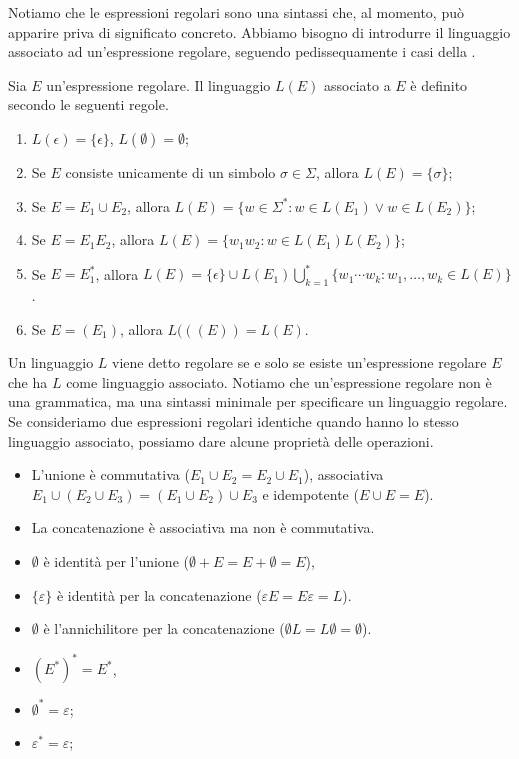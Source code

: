 Notiamo che le espressioni regolari sono una sintassi che, al momento, può apparire priva di significato concreto.
Abbiamo bisogno di introdurre il linguaggio associato ad un'espressione regolare, seguendo pedissequamente i casi della .

\begin{definition}\label{def:regex-linguaggio}
Sia $E$ un'espressione regolare. Il linguaggio $L(E)$ associato a $E$ è definito secondo le seguenti regole.
\begin{enumerate}
	  \item $L(\epsilon) = \{\epsilon\}$, $L(\emptyset) = \emptyset$;
\item Se $E$ consiste unicamente di un simbolo $\sigma\in\Sigma$, allora $L(E) = \{\sigma\}$;
\item Se $E=E_1 \cup E_2$, allora $L(E) = \{w\in \Sigma^{*} : w\in L(E_{1}) \vee  w\in L(E_{2})\}$;
\item Se $E=E_1E_2$, allora $L(E) = \{ w_{1}w_{2} : w\in L(E_1) L(E_2) \}$;
\item Se $E = E_1^{*}$, allora $L(E) = \{\epsilon\} \cup L(E_1) \bigcup_{k=1}^{*} \{w_1 \cdots w_{k}: w_{1}, \ldots, w_{k}\in L(E) \}$.
\item Se $E = (E_1)$, allora $L(((E)) = L(E)$.
\end{enumerate}
\end{definition}

Un linguaggio $L$ viene detto regolare se e solo se esiste un'espressione regolare $E$ che ha $L$ come linguaggio associato.
Notiamo che un'espressione regolare non è una grammatica, ma una sintassi minimale per specificare un linguaggio regolare.
Se consideriamo due espressioni regolari identiche quando hanno lo stesso linguaggio associato, possiamo dare alcune proprietà delle operazioni.

\begin{proposition}\label{prop:regex-associative-commutative}
\begin{itemize}
\item
L'unione è commutativa ($E_1 \cup E_2 = E_2 \cup E_1$), associativa $E_1 \cup (E_2 \cup E_3) = (E_1 \cup E_2) \cup E_3$
e idempotente ($E\cup E = E$).
\item
La concatenazione è associativa ma non è commutativa.
\item
	  $\emptyset$ è identità per l'unione ($\emptyset+E=E+\emptyset=E$),
\item
	  $ \{\varepsilon \} $ è identità per la concatenazione
($\varepsilon E=E\varepsilon=L$).
\item
$\emptyset$ è l'annichilitore per la concatenazione ($\emptyset L=L\emptyset=\emptyset$).
\item
	$(E^{*})^{*}=E^{*}$,
\item
$\emptyset^*=\varepsilon$;
\item
$\varepsilon^*=\varepsilon$;
\end{itemize}
\end{proposition}

